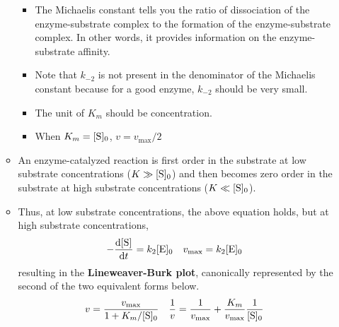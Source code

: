 \documentclass[../notes.tex]{subfiles}
\begin{document}
\begin{itemize}
\begin{itemize}
        \begin{itemize}
            \item The Michaelis constant tells you the ratio of dissociation of the enzyme-substrate complex to the formation of the enzyme-substrate complex. In other words, it provides information on the enzyme-substrate affinity.
            \item Note that $k_{-2}$ is not present in the denominator of the Michaelis constant because for a good enzyme, $k_{-2}$ should be very small.
            \item The unit of $K_m$ should be concentration.
            \item When $K_m=\cnc[0]{S}$, $v=v_\text{max}/2$
        \end{itemize}
        \item An enzyme-catalyzed reaction is first order in the substrate at low substrate concentrations ($K\gg\cnc[0]{S}$) and then becomes zero order in the substrate at high substrate concentrations ($K\ll\cnc[0]{S}$).
        \item Thus, at low substrate concentrations, the above equation holds, but at high substrate concentrations,
        \begin{align*}
            -\dv{\cnc{S}}{t} &= k_2\cnc[0]{E}&
            v_\text{max} &= k_2\cnc[0]{E}
        \end{align*}
        resulting in the \textbf{Lineweaver-Burk plot}, canonically represented by the second of the two equivalent forms below.
        \begin{align*}
            v &= \frac{v_\text{max}}{1+K_m/\cnc[0]{S}}&
            \frac{1}{v} &= \frac{1}{v_\text{max}}+\frac{K_m}{v_\text{max}}\frac{1}{\cnc[0]{S}}
        \end{align*}
    \end{itemize}
\end{itemize}
\end{document}
